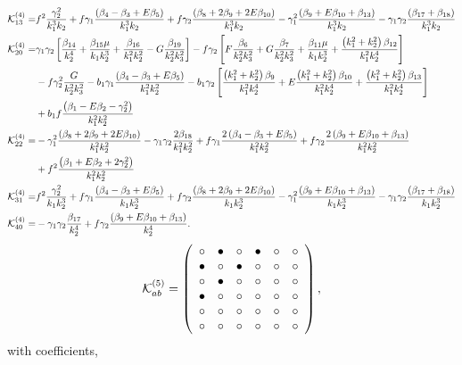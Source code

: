 \begin{align*}
\mathcal{K}_{13}^{(4)}=& f^2 \frac{\gamma_2^2}{k_1^3 k_2} + f \gamma_1 \frac{\left( {\beta_{4}-\beta_{3}} + E \beta_{5} \right)}{k_1^3 k_2} + f \gamma_2 \frac{\left( \beta_{8} + 2 \beta_{9} + 2 E \beta_{10} \right)}{k_1^3 k_2} - \gamma_1^2 \frac{\left( \beta_{9} + E \beta_{10} + \beta_{13} \right)}{k_1^3 k_2} - \gamma_1 \gamma_2 \frac{\left( \beta_{17} + \beta_{18} \right)}{k_1^3 k_2} \\
\mathcal{K}_{20}^{(4)}=& \gamma_1 \gamma_2 \left[ \frac{\beta_{14}}{k_2^4} + \frac{\beta_{15} \mu }{k_1 k_2^3} + \frac{\beta_{16}}{k_1^2 k_2^2} - G \frac{\beta_{19}}{k_2^2 k_3^2} \right] - f \gamma_2 \left[ F \frac{\beta_{6}}{k_2^2 k_3^2} + G \frac{\beta_{7}}{k_2^2 k_3^2} + \frac{\beta_{11} \mu}{k_1 k_2^3} + \frac{\left( k_1^2 + k_2^2 \right) \beta_{12}}{k_1^2 k_2^4} \right] \\
&- f \gamma_2^2 \frac{G}{k_2^2 k_3^2} - b_1 \gamma_1 \frac{\left( {\beta_{4}-\beta_{3}} + E \beta_{5} \right)}{k_1^2 k_2^2} - b_1 \gamma_2 \left[ \frac{\left( k_1^2 + k_2^2 \right) \beta_{9}}{k_1^2 k_2^4} + E \frac{\left( k_1^2 + k_2^2 \right) \beta_{10} }{k_1^2 k_2^4} + \frac{\left( k_1^2 + k_2^2 \right) \beta_{13}}{k_1^2 k_2^4} \right] \\
&+ b_1 f \frac{\left( \beta_1 - E \beta_2 - \gamma_2^2 \right)}{k_1^2 k_2^2} \\
\mathcal{K}_{22}^{(4)}=& - \gamma_1^2 \frac{\left( \beta_{8} + 2 \beta_{9} + 2 E \beta_{10} \right)}{k_1^2 k_2^2} - \gamma_1 \gamma_2 \frac{2 \beta_{18}}{k_1^2 k_2^2}+  f \gamma_1 \frac{2\left( {\beta_{4}-\beta_{3}} + E \beta_{5} \right)}{k_1^2 k_2^2} + f \gamma_2 \frac{2 \left( \beta_{9} + E \beta_{10} + \beta_{13} \right)}{k_1^2 k_2^2} \\
&+ f^2 \frac{\left( \beta_1 + E \beta_2 + 2 \gamma_2^2 \right)}{k_1^2 k_2^2} \\
\mathcal{K}_{31}^{(4)}=& f^2 \frac{\gamma_2^2}{k_1 k_2^3} + f \gamma_1 \frac{\left( {\beta_{4}-\beta_{3}} + E \beta_{5}\right)}{k_1 k_2^3} + f \gamma_2 \frac{\left( \beta_{8} + 2 \beta_{9} + 2 E \beta_{10}  \right)}{k_1 k_2^3} - \gamma_1^2 \frac{\left( \beta_{9} + E \beta_{10} + \beta_{13} \right)}{k_1 k_2^3} - \gamma_1 \gamma_2 \frac{\left( \beta_{17} + \beta_{18} \right)}{k_1 k_2^3} \\
\mathcal{K}_{40}^{(4)}=&  - \gamma_1 \gamma_2 \frac{\beta_{17}}{k_2^4} + f \gamma_2 \frac{\left( \beta_{9} + E \beta_{10} + \beta_{13} \right)}{k_2^4}  .
\end{align*}
\begin{equation}
	\mathcal{K}^{(5)}_{ab}= 
 \left( \begin {array}{cccccc} \circ &\bullet &\circ &\bullet 
&\circ &\circ \\  \bullet &\circ &\bullet &
\circ &\circ &\circ \\  \circ &\bullet &
\circ &\circ &\circ &\circ \\  \bullet &
\circ &\circ &\circ &\circ &\circ \\  
\circ &\circ &\circ &\circ &\circ &\circ 
\\  \circ &\circ &\circ &\circ &\circ &
\circ \end {array} \right), 
\end{equation}
with coefficients, 


